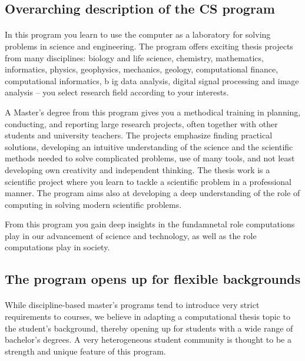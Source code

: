 \documentclass[%
oneside,                 %
final,                   %
10pt]{article}
\begin{document}
\subsection{Overarching description of the CS program}

\paragraph{}
In this program you learn to use the computer as a laboratory for
solving problems in science and engineering. The program offers
exciting thesis projects from many disciplines: biology and life
science, chemistry, mathematics, informatics, physics, geophysics,
mechanics, geology, computational finance, computational informatics, b
ig data analysis, digital signal processing
and image analysis – you select research field according to
your interests.

A Master’s degree from this program gives you a methodical
training in planning, conducting, and reporting large research
projects, often together with other students and university teachers.
The projects emphasize finding practical solutions, developing an
intuitive understanding of the science and the scientific methods
needed to solve complicated problems, use of many tools, and not least
developing own creativity and independent thinking. The thesis
work is a scientific project where you learn to tackle a
scientific problem in a professional manner.   The program aims also at
developing a deep understanding of the role of computing in solving modern scientific
problems. 

From this program you gain  deep insights in the fundamnetal role
computations play  in our advancement of science and technology, as well as the role computations play  in society.



\subsection{The program opens up for flexible backgrounds}


\paragraph{}
While discipline-based master's programs tend to introduce very strict
requirements to courses, we believe in adapting a computational thesis
topic to the student's background, thereby opening up for
students with a wide range of bachelor's degrees.
A very heterogeneous student community is thought to be a strength and
unique feature of this program.
\end{document}
